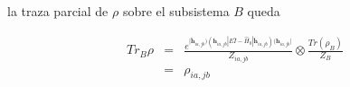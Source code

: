 \documentclass{beamer}
\begin{document}
\begin{frame}
\pause
la traza parcial de $\rho$ sobre el subsistema $B$ queda 

\begin{eqnarray*}
	Tr_B \rho &=& \frac{e^{| {\bm{\widetilde{h}}_{ia,jb} ) (\bm{h}_{ia,jb}| E \hat{I} - \hat{H}_0 | 
	\bm{\widetilde{h}}_{ia,jb} )   (\bm{h}_{ia,jb}|}}}{Z_{ia,jb}} \otimes \frac{Tr(\rho_B)}{Z_{B}} \\
	&=& \rho_{ia,jb} 
\end{eqnarray*}






\vfill
 




\end{frame}
\end{document}

